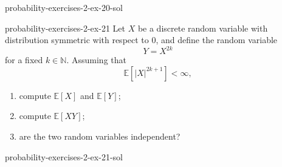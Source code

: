 \documentclass[preview]{standalone}
\begin{document}
\begin{snippetsolution}{probability-exercises-2-ex-20-sol}{}
    \todo
\end{snippetsolution}

\begin{snippetexercise}{probability-exercises-2-ex-21}{}
    Let \(X\) be a discrete random variable with distribution symmetric with
    respect to \(0\), and define the random variable
    \[
        Y = X^{2k}
    \]
    for a fixed \(k\in\mathbb{N}\). Assuming that
    \[
        \mathbb E\left[|X|^{2k+1}\right] < \infty,
    \]
    \begin{enumerate}
        \item compute \(\mathbb E[X]\) and \(\mathbb E[Y]\);
        \item compute \(\mathbb E[XY]\);
        \item are the two random variables independent?
    \end{enumerate}
\end{snippetexercise}

\begin{snippetsolution}{probability-exercises-2-ex-21-sol}{}
    \todo
\end{snippetsolution}
\end{document}
